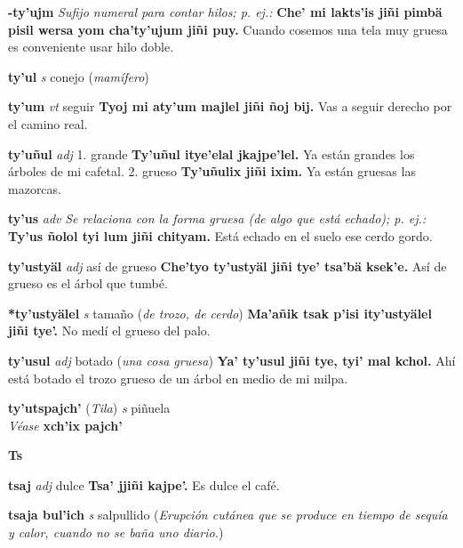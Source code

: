 \documentclass[10pt]{scrbook}
\newcommand{\entry}[1]{\textbf{#1}}
\newcommand{\alphaletter}[1]{\end{multicols}\addsec{#1}\begin{multicols}{2}}
\newcommand{\onedefinition}[1]{#1.}
\newcommand{\nontranslationdef}[1]{\textit{#1}}
\newcommand{\partofspeech}[1]{\textit{#1}}
\newcommand{\spanishtranslation}[1]{#1}
\newcommand{\clarification}[1]{(\textit{#1})}
\newcommand{\cholexample}[1]{\textbf{#1}}
\newcommand{\exampletranslation}[1]{#1}
\newcommand{\alsosee}[1]{\\\textit{Véase} \textbf{#1}}
\newcommand{\relevantdialect}[1]{(\textit{#1})}
\begin{document}
\begin{multicols}{2}
\entry{-ty'ujm}
\nontranslationdef{Sufijo numeral para contar hilos; p. ej.:}
\cholexample{Che' mi lakts'is jiñi pimbä pisil wersa yom cha'ty'ujum jiñi puy.}
\exampletranslation{Cuando cosemos una tela muy gruesa es conveniente usar hilo doble.}

\entry{ty'ul}
\partofspeech{s}
\spanishtranslation{conejo}
\clarification{mamífero}

\entry{ty'um}
\partofspeech{vt}
\spanishtranslation{seguir}
\cholexample{Tyoj mi aty'um majlel jiñi ñoj bij.}
\exampletranslation{Vas a seguir derecho por el camino real.}

\entry{ty'uñul}
\partofspeech{adj}
\onedefinition{1}
\spanishtranslation{grande}
\cholexample{Ty'uñul itye'elal jkajpe'lel.}
\exampletranslation{Ya están grandes los árboles de mi cafetal.}
\onedefinition{2}
\spanishtranslation{grueso}
\cholexample{Ty'uñulix jiñi ixim.}
\exampletranslation{Ya están gruesas las mazorcas.}

\entry{ty'us}
\partofspeech{adv}
\nontranslationdef{Se relaciona con la forma gruesa (de algo que está echado); p. ej.:}
\cholexample{Ty'us ñolol tyi lum jiñi chityam.}
\exampletranslation{Está echado en el suelo ese cerdo gordo.}

\entry{ty'ustyäl}
\partofspeech{adj}
\spanishtranslation{así de grueso}
\cholexample{Che'tyo ty'ustyäl jiñi tye' tsa'bä ksek'e.}
\exampletranslation{Así de grueso es el árbol que tumbé.}

\entry{*ty'ustyälel}
\partofspeech{s}
\spanishtranslation{tamaño}
\clarification{de trozo, de cerdo}
\cholexample{Ma'añik tsak p'isi ity'ustyälel jiñi tye'.}
\exampletranslation{No medí el grueso del palo.}

\entry{ty'usul}
\partofspeech{adj}
\spanishtranslation{botado}
\clarification{una cosa gruesa}
\cholexample{Ya' ty'usul jiñi tye, tyi' mal kchol.}
\exampletranslation{Ahí está botado el trozo grueso de un árbol en medio de mi milpa.}

\entry{ty'utspajch'}
\relevantdialect{Tila}
\partofspeech{s}
\spanishtranslation{piñuela}
\alsosee{xch'ix pajch'}

\entry{Ts}
\alphaletter{Ts}

\entry{tsaj}
\partofspeech{adj}
\spanishtranslation{dulce}
\cholexample{Tsa' jjiñi kajpe'.}
\exampletranslation{Es dulce el café.}

\entry{tsaja bul'ich}
\partofspeech{s}
\spanishtranslation{salpullido}
\clarification{Erupción cutánea que se produce en tiempo de sequía y calor, cuando no se baña uno diario.}


\end{multicols}
\end{document}
